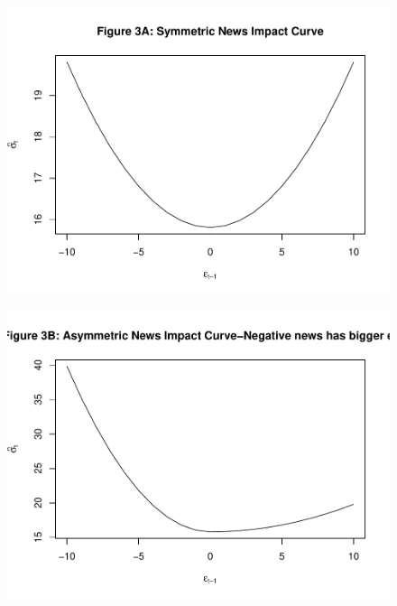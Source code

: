 \documentclass[]{book}
\theoremstyle{definition}
\theoremstyle{definition}
\theoremstyle{definition}
\theoremstyle{remark}
\begin{document}
\begin{figure}

{\centering \includegraphics[width=1\linewidth]{bookdown-demo_files/figure-latex/ch7-figure2-1} 

}

\end{figure}
\begin{figure}

{\centering \includegraphics[width=1\linewidth]{bookdown-demo_files/figure-latex/ch7-figure2-2} 

}

\end{figure}
\end{document}
